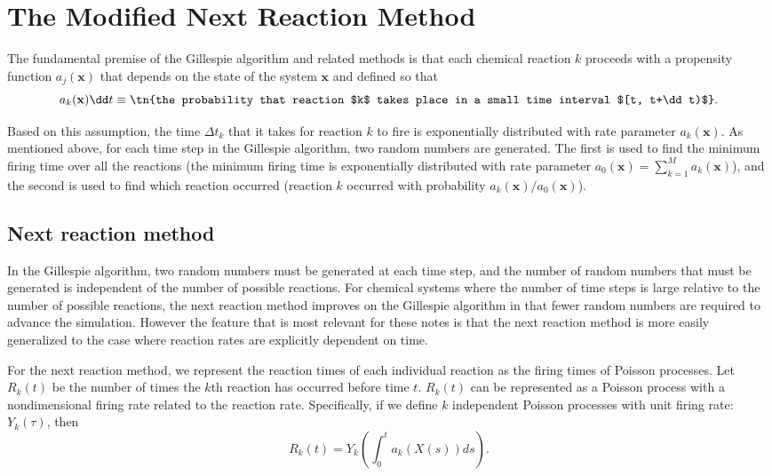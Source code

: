 
\chapter{The Modified Next Reaction Method}
\label{cha:modif-next-react}

The fundamental premise of the Gillespie algorithm and related methods
\cite{Gillespie2007} is that each chemical reaction $k$ proceeds with
a propensity function $a_j(\mathbf{x})$ that depends on the state of
the system $\mathbf{x}$ and defined so that
\begin{equation}
  \label{eq:prop-def}
  a_k(\mathbf{x}) \dd t \equiv \tn{the probability that reaction $k$
    takes place in a small time interval $[t, t+\dd t)$}.
\end{equation}

Based on this assumption, the time $\Delta t_k$ that it takes for
reaction $k$ to fire is exponentially distributed with rate parameter
$a_k(\mathbf{x})$. As mentioned above, for each time step in the
Gillespie algorithm, two random numbers are generated. The first is
used to find the minimum firing time over all the reactions (the
minimum firing time is exponentially distributed with rate parameter
$a_0(\mathbf{x}) = \sum_{k=1}^M a_k(\mathbf{x})$), and the second is
used to find which reaction occurred (reaction $k$ occurred with
probability $a_k(\mathbf{x}) / a_0 (\mathbf{x})$).

\section{Next reaction method}
\label{sec:next-reaction-method}

In the Gillespie algorithm, two random numbers must be generated at
each time step, and the number of random numbers that must be
generated is independent of the number of possible reactions. For
chemical systems where the number of time steps is large relative to
the number of possible reactions, the next reaction method improves on
the Gillespie algorithm in that fewer random numbers are required to
advance the simulation. However the feature that is most relevant for
these notes is that the next reaction method is more easily
generalized to the case where reaction rates are explicitly dependent
on time.

For the next reaction method, we represent the reaction times of each
individual reaction as the firing times of Poisson processes. Let
$R_k(t)$ be the number of times the $k$th reaction has occurred before
time $t$. $R_k(t)$ can be represented as a Poisson process with a
nondimensional firing rate related to the reaction rate. Specifically,
if we define $k$ independent Poisson processes with unit firing rate:
$Y_k(\tau)$, then
\begin{equation}
  \label{eq:R-def}
  R_k(t) = Y_k\left(\int_0^t a_k(X(s)) ds \right).
\end{equation}

